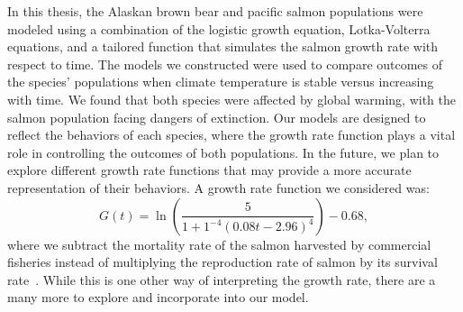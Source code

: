 In this thesis, the Alaskan brown bear and pacific salmon populations were modeled using a combination of the logistic growth equation, Lotka-Volterra equations, and a tailored function that simulates the salmon growth rate with respect to time.
The models we constructed were used to compare outcomes of the species' populations when  climate temperature is stable versus increasing with time.
We found that both species were affected by global warming, with the salmon population facing dangers of extinction.
Our models are designed to reflect the behaviors of each species, where the growth rate function plays a vital role in controlling the outcomes of both populations.
In the future, we plan to explore different growth rate functions that may provide a more accurate representation of their behaviors.
A growth rate function we considered was:
\begin{equation*}
    G(t) = \ln\left(\frac{5}{1+1^{-4}(0.08t-2.96)^4}\right) - 0.68,
\end{equation*}
where we subtract the mortality rate of the salmon harvested by commercial fisheries instead of multiplying the reproduction rate of salmon by its survival rate~\cite{NPS}.
While this is one other way of interpreting the growth rate, there are a many more to explore and incorporate into our model.

